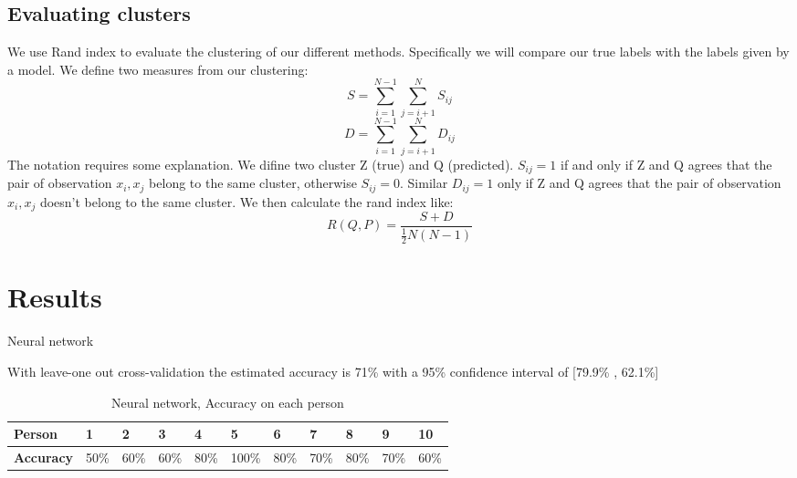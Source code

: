 \documentclass{article}
\begin{document}
\subsection*{Evaluating clusters}
We use Rand index to evaluate the clustering of our different methods. Specifically we will compare our true labels with the labels given by a model.
We define two measures from our clustering:
\begin{equation}
S=\sum_{i=1}^{N-1} \sum_{j=i+1}^{N} S_{i j}
\end{equation}
\begin{equation}
D=\sum_{i=1}^{N-1} \sum_{j=i+1}^{N} D_{i j}
\end{equation}
The notation requires some explanation. We difine two cluster Z (true) and Q (predicted). $S_{ij} = 1$ if and only if  Z and Q agrees that the pair of observation ${x_i,x_j}$ belong to the same cluster, otherwise $S_{ij} = 0$. Similar  $D_{ij} = 1$ only if Z and Q agrees that the pair of observation ${x_i,x_j}$ doesn't belong to the same cluster. 
We then calculate the rand index like:
\begin{equation}
R(Q, P)=\frac{S+D}{\frac{1}{2} N(N-1)}
\end{equation}

\section{Results}

Neural network

With leave-one out cross-validation the estimated accuracy is 71\% with a 95\% confidence interval of  [79.9\% , 62.1\%]

\begin{table}[H]
\begin{tabular}{lllllllllll}
\hline
\textbf{Person}   & 1                        & 2                        & 3    & 4    & 5     & 6    & 7    & 8    & 9    & 10   \\ \hline
\textbf{Accuracy} & \multicolumn{1}{c}{50\%} & \multicolumn{1}{c}{60\%} & 60\% & 80\% & 100\% & 80\% & 70\% & 80\% & 70\% & 60\% \\ \hline
\end{tabular}
\caption{Neural network, Accuracy on each person}
\label{tab:nn}
\end{table}
\end{document}

